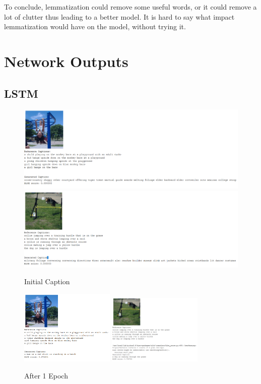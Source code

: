 \documentclass{article}
\begin{document}
    To conclude, lemmatization could remove some useful words, or it could remove a lot of clutter thus leading to a better model. It is hard to say what impact lemmatization would have on the model, without trying it.\\

    \section{Network Outputs}

    \subsection{LSTM}
    \begin{figure}[H]
        \centering
        \includegraphics[width=1\textwidth]{lstm_girl_epoch_0.PNG}
        \includegraphics[width=1\textwidth]{lstm_dog_epoch_0.PNG}
        \caption{Initial Caption}
    \end{figure}

    \begin{figure}[H]
        \centering
        \includegraphics[width=0.4\textwidth]{lstm_girl_epoch_1.PNG}
        \includegraphics[width=0.4\textwidth]{lstm_dog_epoch_1.PNG}
        \caption{After 1 Epoch}
    \end{figure}
\end{document}
